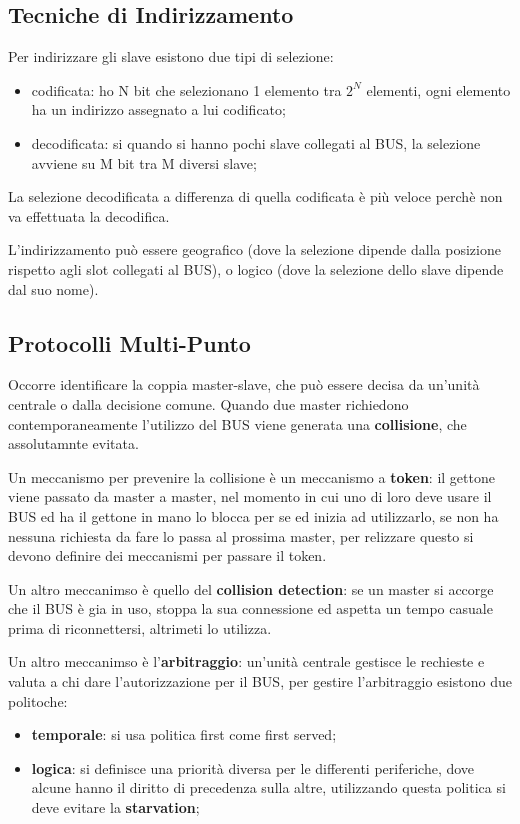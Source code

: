 \documentclass[12pt]{article}
\begin{document}
\subsection{Tecniche di Indirizzamento}
Per indirizzare gli slave esistono due tipi di selezione:
\begin{itemize}
    \item codificata: ho N bit che selezionano 1 elemento tra $2^{N}$ elementi, ogni elemento ha un indirizzo assegnato a lui codificato;
    \item decodificata: si quando si hanno pochi slave collegati al BUS, la selezione avviene su M bit tra M diversi slave;
\end{itemize}
La selezione decodificata a differenza di quella codificata \`e pi\`u veloce perch\`e non va effettuata la decodifica.

L'indirizzamento pu\`o essere geografico (dove la selezione dipende dalla posizione rispetto agli slot collegati al BUS), o logico (dove la selezione dello slave dipende dal suo nome).

\subsection{Protocolli Multi-Punto}
Occorre identificare la coppia master-slave, che pu\`o essere decisa da un'unit\`a centrale o dalla decisione comune. Quando due master richiedono contemporaneamente l'utilizzo del BUS viene generata una \textbf{collisione}, che assolutamnte evitata.

Un meccanismo per prevenire la collisione \`e un meccanismo a \textbf{token}: il gettone viene passato da master a master, nel momento in cui uno di loro deve usare il BUS ed ha il gettone in mano lo blocca per se ed inizia ad utilizzarlo, se non ha nessuna richiesta da fare lo passa al prossima master, per relizzare questo si devono definire dei meccanismi per passare il token.

Un altro meccanimso \`e quello del \textbf{collision detection}: se un master si accorge che il BUS \`e gia in uso, stoppa la sua connessione ed aspetta un tempo casuale prima di riconnettersi, altrimeti lo utilizza.

Un altro meccanimso \`e l'\textbf{arbitraggio}: un'unit\`a centrale gestisce le rechieste e valuta a chi dare l'autorizzazione per il BUS, per gestire l'arbitraggio esistono due politoche:
\begin{itemize}
    \item \textbf{temporale}: si usa politica first come first served;
    \item \textbf{logica}: si definisce una priorit\`a diversa per le differenti periferiche, dove alcune hanno il diritto di precedenza sulla altre, utilizzando questa politica si deve evitare la \textbf{starvation};
\end{itemize}
\end{document}
